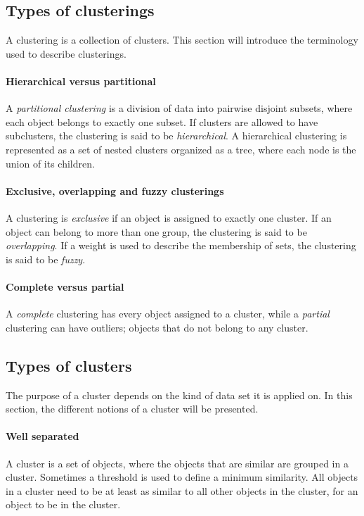 \subsection{Types of clusterings}

A clustering is a collection of clusters.
This section will introduce the terminology used to describe clusterings. 

\paragraph{Hierarchical versus partitional}
A \textit{partitional clustering} is a division of data into pairwise disjoint subsets, where each object belongs to exactly one subset.
If clusters are allowed to have subclusters, the clustering is said to be \textit{hierarchical}.
A hierarchical clustering is represented as a set of nested clusters organized as a tree, where each node is the union of its children.

\paragraph{Exclusive, overlapping and fuzzy clusterings}

A clustering is \textit{exclusive} if an object is assigned to exactly one cluster.
If an object can belong to more than one group, the clustering is said to be \textit{overlapping}.
If a weight is used to describe the membership of sets, the clustering is said to be \textit{fuzzy}.

\paragraph{Complete versus partial}

A \textit{complete} clustering has every object assigned to a cluster, while a \textit{partial} clustering can have outliers; objects that do not belong to any cluster.

\subsection{Types of clusters}
The purpose of a cluster depends on the kind of data set it is applied on.
In this section, the different notions of a cluster will be presented.

\paragraph{Well separated}
A cluster is a set of objects, where the objects that are similar are grouped in a cluster. 
Sometimes a threshold is used to define a minimum similarity. 
All objects in a cluster need to be at least as similar to all other objects in the cluster, for an object to be in the cluster.

